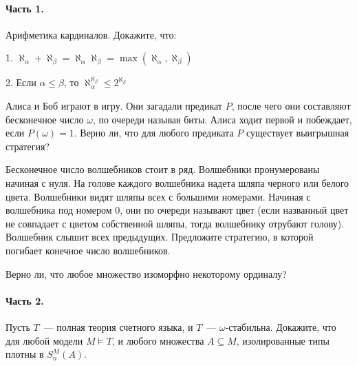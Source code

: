 \setcounter{curtask}{1}

\mytitle{}

\paragraph{Часть 1.}


\begin{task}
    Арифметика кардиналов. Докажите, что:
    
    1. $\aleph_{\alpha} + \aleph_{\beta} = \aleph_{\alpha}  \aleph_{\beta} =
    	\max(\aleph_{\alpha}, \aleph_{\beta})$
     
    2. Если $\alpha \le \beta$, то $\aleph_{\alpha}^{\aleph_{\beta}} \le 2^{\aleph_{\beta}}$
\end{task}

\begin{task}
	Алиса и Боб играют в игру. Они загадали предикат $P$, после чего они составляют
    бесконечное число $\omega$, по очереди называя биты. Алиса ходит первой и
    побеждает, если $P(\omega) = 1$. Верно ли, что для любого предиката $P$
    существует выигрышная стратегия?
\end{task}

\begin{task}
    Бесконечное число волшебников стоит в ряд. Волшебники пронумерованы начиная с
    нуля. На голове каждого волшебника надета шляпа черного или белого
    цвета. Волшебники видят шляпы всех с большими номерами. Начиная с волшебника под
    номером $0$, они по очереди называют цвет (если названный цвет не совпадает с
    цветом собственной шляпы, тогда волшебнику отрубают голову). Волшебник слышит
    всех предыдущих. Предложите стратегию, в которой погибает конечное число
    волшебников.
\end{task}

\begin{task}
    Верно ли, что любое множество изоморфно некоторому ординалу?
\end{task}

\breakline

\paragraph{Часть 2.}

\begin{task}
    Пусть $T$~--- полная теория счетного языка, и $T$~---
    $\omega$-стабильна. Докажите, что для любой модели $M \models T$, и любого
    множества $A \subseteq M$, изолированные типы плотны в $S_n^M(A)$. 
\end{task}

